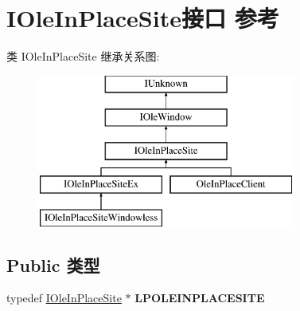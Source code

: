 \hypertarget{interface_i_ole_in_place_site}{}\section{I\+Ole\+In\+Place\+Site接口 参考}
\label{interface_i_ole_in_place_site}
类 I\+Ole\+In\+Place\+Site 继承关系图\+:\begin{figure}[H]
\begin{center}
\leavevmode
\includegraphics[height=5.000000cm]{interface_i_ole_in_place_site}
\end{center}
\end{figure}
\subsection*{Public 类型}
\begin{DoxyCompactItemize}
\item 
\mbox{\label{interface_i_ole_in_place_site_a09357791e59260d971c1e671318cc2b4}} 
typedef \hyperlink{interface_i_ole_in_place_site}{I\+Ole\+In\+Place\+Site} $\ast$ {\bfseries L\+P\+O\+L\+E\+I\+N\+P\+L\+A\+C\+E\+S\+I\+TE}
\end{DoxyCompactItemize}
